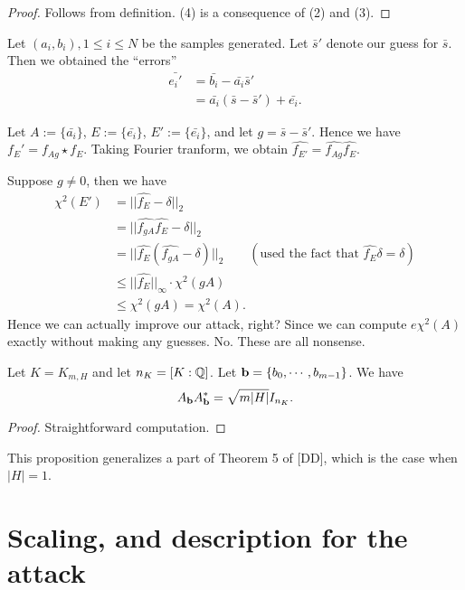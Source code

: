 \documentclass{amsart}
\begin{document}
{\begin{proof}
Follows from definition. (4) is a consequence of (2) and (3).
\end{proof}

Let $(a_i,b_i), 1 \leq i \leq N$ be the samples generated.
Let $\bar{s}'$ denote our guess for $\bar{s}$. Then we obtained the ``errors''
\begin{align*}
    \bar{e_i'} &= \bar{b_i} - \bar{a_i}\bar{s}' \\
               &= \bar{a_i}(\bar{s}- \bar{s}') + \bar{e_i}.
\end{align*}

Let $A := \{\bar{a_i}\}$,  $E := \{\bar{e_i}\}$, $E' := \{\bar{e_i}\}$, and let $g = \bar{s}- \bar{s}'$. Hence we have
$f_E' = f_{Ag} \star f_{E}$. Taking Fourier tranform, we obtain $\hat{f_{E'}} = \hat{f_{A g}}  \hat{f_E}$.

Suppose $g \neq 0$, then we have
\begin{align*}
\chi^2(E')  & =  ||\hat{f_E} - \delta||_2 \\
           & = ||\hat{f_{gA}}  \hat{f_E} - \delta||_2 \\
          & = ||\hat{f_E}(\hat{f_{gA}}  - \delta)||_2 \qquad (\mbox{used the fact that } \hat{f_E} \delta = \delta) \\
          & \leq ||\hat{f_E}||_\infty \cdot \chi^2(gA) \\
          & \leq \chi^2(gA) = \chi^2(A).
\end{align*}
Hence we can actually improve our attack, right? Since we can compute $e\chi^2(A)$ exactly without making any guesses. No. These are all nonsense.

\begin{Prop}
Let $K = K_{m,H}$ and let $n_K = [K:\mathbb{Q}]$. Let ${\bf b} = \{b_0, \cdots, b_{m-1}\}$. We have
$$A_{\bf b} A_{\bf b}^* = \sqrt{m|H|}I_{n_K}.$$
\end{Prop}


\begin{proof}
Straightforward computation.
\end{proof}

\begin{remark}
This proposition generalizes a part of Theorem 5 of [DD], which is the case when $|H| = 1$.
\end{remark}


\section{Scaling, and description for the attack}

}
\end{document}
